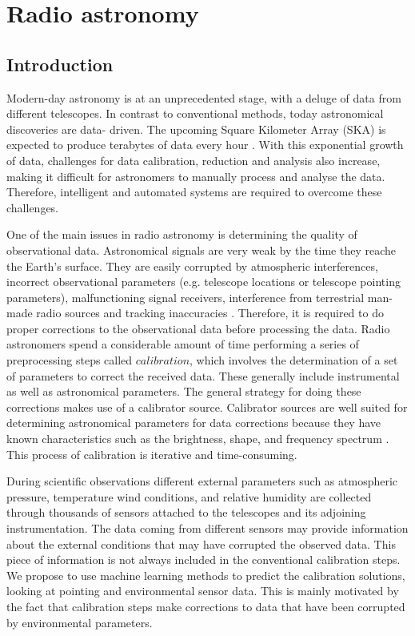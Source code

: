 \chapter{Radio astronomy}

\section{Introduction}


Modern-day astronomy is at an unprecedented stage, with a deluge of data from different telescopes. In contrast
to conventional methods, today astronomical discoveries are data- driven. The upcoming Square Kilometer Array (SKA) is expected to produce terabytes of data every hour \citep{aniyan2017classifying}. With this exponential growth of data, challenges for data calibration, reduction and analysis also increase, making it difficult for astronomers to manually process and analyse the data. Therefore, intelligent and automated systems are required  to overcome these challenges.

One of the main issues in radio astronomy is determining the quality of observational data. Astronomical signals are very weak  by the time they reache the Earth’s surface. They are easily corrupted by atmospheric interferences, incorrect observational parameters (e.g. telescope locations or telescope pointing parameters), malfunctioning signal receivers, interference from terrestrial man-made radio sources and tracking inaccuracies \citep{taylor1999synthesis}. Therefore, it is required to do proper corrections to the observational data before processing the data. Radio astronomers spend a considerable amount of time performing a series of preprocessing steps called $\textit{calibration}$, which involves the determination of a set of parameters to correct the received data. These generally include instrumental as well as astronomical parameters. The general strategy for doing these corrections makes use of a calibrator source. Calibrator sources are well suited for determining astronomical parameters for data corrections because they have known characteristics such as the brightness, shape, and frequency spectrum \citep{taylor1999synthesis}. This process of calibration is iterative and time-consuming.

During scientific observations different  external parameters such as atmospheric pressure, temperature  wind conditions, and relative humidity  are collected through thousands of sensors attached to the telescopes and its adjoining instrumentation. The data coming from different sensors may provide information about the external conditions that may have corrupted the observed data. This piece of information is not always included in the conventional calibration steps. We propose to use machine learning methods to predict the calibration solutions, looking at pointing and environmental sensor data. This is mainly motivated by the fact that calibration steps make corrections to data that have been corrupted by environmental parameters.

